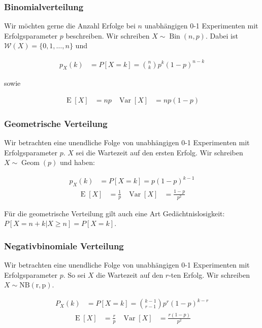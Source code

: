 \documentclass[25pt]{sciposter}
\newcommand{\W}{\mathcal{W}}
\newcommand{\Var}{\operatorname{Var}}
\newcommand{\E}{\operatorname{E}}
\begin{document}
\begin{multicols}{3}
\subsubsection*{Binomialverteilung}
Wir möchten gerne die Anzahl Erfolge bei $n$ unabhängigen 0-1 Experimenten mit Erfolgsparameter $p$ beschreiben. Wir schreiben $X \sim \operatorname{Bin}(n,p)$. Dabei ist $\W(X) = \{0,1,\ldots,n\}$ und 

\begin{align*}
	p_X(k) &= P[X=k] = {n \choose k} p^k (1-p)^{n-k}
\end{align*}

sowie 

\begin{align*}
	\E[X] &= np & \Var[X] &= np(1-p)
\end{align*}


\subsubsection*{Geometrische Verteilung}
Wir betrachten eine unendliche Folge von unabhängigen 0-1 Experimenten mit Erfolgsparameter $p$. $X$ sei die Wartezeit auf den ersten Erfolg. Wir schreiben $X\sim\operatorname{Geom}(p)$ und haben:

\begin{align*}
	p_X(k) &= P[X=k] = p(1-p)^{k-1}
\end{align*}
\begin{align*}
	\E[X] &= \frac{1}{p} & \Var[X] &= \frac{1-p}{p^2}
\end{align*}

Für die geometrische Verteilung gilt auch eine Art Gedächtnislosigkeit: $P[X = n+k | X \geq n ] = P[X = k]$.

\subsubsection*{Negativbinomiale Verteilung}
Wir betrachten eine unendliche Folge von unabhängigen 0-1 Experimenten mit Erfolgsparameter $p$. So sei $X$ die Wartezeit auf den $r$-ten Erfolg. Wir schreiben $X\sim \operatorname{NB(r,p)}$.

\begin{align*}
	P_X(k) &= P[X = k] = {k-1 \choose r-1} p^r(1-p)^{k-r}
\end{align*}
\begin{align*}
\E[X] &= \frac{r}{p} & \Var[X] &= \frac{r(1-p)}{p^2}
\end{align*}


\end{multicols}
\end{document}
